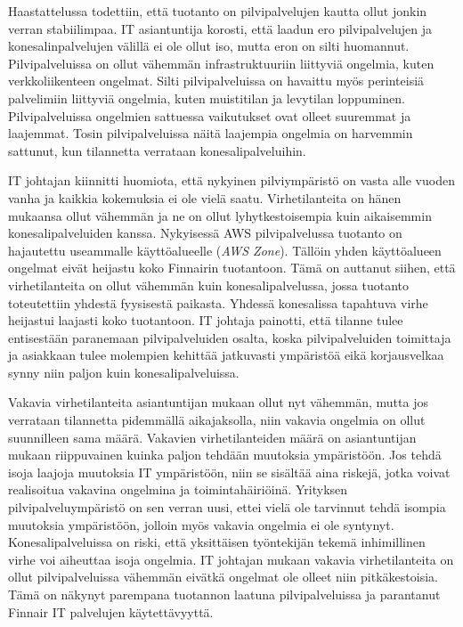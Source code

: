 Haastattelussa todettiin, että tuotanto on pilvipalvelujen kautta ollut jonkin verran stabiilimpaa. IT asiantuntija korosti, että laadun ero pilvipalvelujen ja konesalinpalvelujen välillä ei ole ollut iso, mutta eron on silti huomannut. Pilvipalveluissa on ollut vähemmän infrastruktuuriin liittyviä ongelmia, kuten verkkoliikenteen ongelmat. Silti pilvipalveluissa on havaittu myös perinteisiä palvelimiin liittyviä ongelmia, kuten muistitilan ja levytilan loppuminen. Pilvipalveluissa ongelmien sattuessa vaikutukset ovat olleet suuremmat ja laajemmat. Tosin pilvipalveluissa näitä laajempia ongelmia on harvemmin sattunut, kun tilannetta verrataan konesalipalveluihin.

IT johtajan kiinnitti huomiota, että nykyinen pilviympäristö on vasta alle vuoden vanha ja kaikkia kokemuksia ei ole vielä saatu. Virhetilanteita on hänen mukaansa ollut vähemmän ja ne on ollut lyhytkestoisempia kuin aikaisemmin konesalipalveluiden kanssa. Nykyisessä AWS pilvipalvelussa tuotanto on hajautettu useammalle käyttöalueelle (\emph{AWS Zone}). Tällöin yhden käyttöalueen ongelmat eivät heijastu koko Finnairin tuotantoon. Tämä on auttanut siihen, että virhetilanteita on ollut vähemmän kuin konesalipalvelussa, jossa tuotanto toteutettiin yhdestä fyysisestä paikasta. Yhdessä konesalissa tapahtuva virhe heijastui laajasti koko tuotantoon. IT johtaja painotti, että tilanne tulee entisestään paranemaan pilvipalveluiden osalta, koska pilvipalveluiden toimittaja ja asiakkaan tulee molempien kehittää jatkuvasti ympäristöä eikä korjausvelkaa synny niin paljon kuin konesalipalveluissa.

Vakavia virhetilanteita asiantuntijan mukaan ollut nyt vähemmän, mutta jos verrataan tilannetta pidemmällä aikajaksolla, niin vakavia ongelmia on ollut suunnilleen sama määrä. Vakavien virhetilanteiden määrä on asiantuntijan mukaan riippuvainen kuinka paljon tehdään muutoksia ympäristöön. Jos tehdä isoja laajoja muutoksia IT ympäristöön, niin se sisältää aina riskejä, jotka voivat realisoitua vakavina ongelmina ja toimintahäiriöinä. Yrityksen pilvipalveluympäristö on sen verran uusi, ettei vielä ole tarvinnut tehdä isompia muutoksia ympäristöön, jolloin myös vakavia ongelmia ei ole syntynyt. Konesalipalveluissa on riski, että yksittäisen työntekijän tekemä inhimillinen virhe voi aiheuttaa isoja ongelmia. IT johtajan mukaan vakavia virhetilanteita on ollut pilvipalveluissa vähemmän eivätkä ongelmat ole olleet niin pitkäkestoisia. Tämä on näkynyt parempana tuotannon laatuna pilvipalveluissa ja parantanut Finnair IT palvelujen käytettävyyttä.

